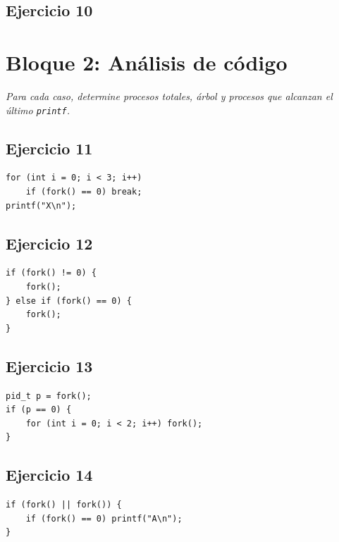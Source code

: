 \documentclass[12pt,a4paper]{article}
\begin{document}
\begin{ejerciciografico}
\subsection*{Ejercicio 10}
\begin{center}\end{center}
\end{ejerciciografico}
\section*{Bloque 2: Análisis de código}
\textit{Para cada caso, determine procesos totales, árbol y procesos que alcanzan el último \texttt{printf}.}
\subsection*{Ejercicio 11}
\begin{lstlisting}
for (int i = 0; i < 3; i++)
    if (fork() == 0) break;
printf("X\n");
\end{lstlisting}
\subsection*{Ejercicio 12}
\begin{lstlisting}
if (fork() != 0) {
    fork();
} else if (fork() == 0) {
    fork();
}
\end{lstlisting}
\subsection*{Ejercicio 13}
\begin{lstlisting}
pid_t p = fork();
if (p == 0) {
    for (int i = 0; i < 2; i++) fork();
}
\end{lstlisting}
\subsection*{Ejercicio 14}
\begin{lstlisting}
if (fork() || fork()) {
    if (fork() == 0) printf("A\n");
}
\end{lstlisting}
\end{document}
